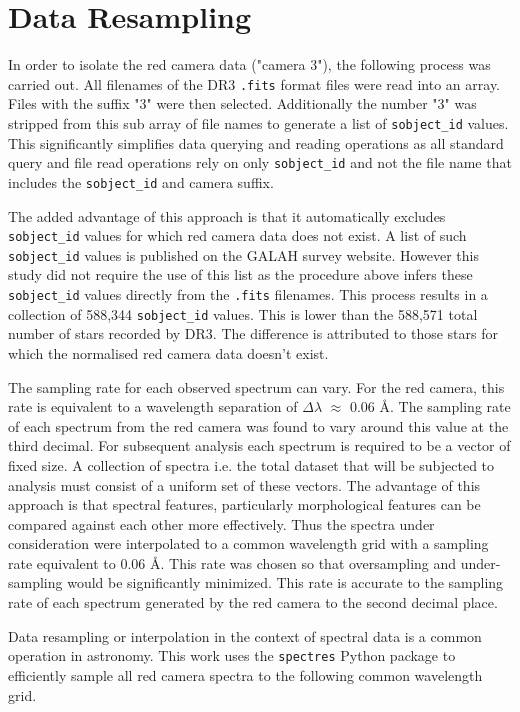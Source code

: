 \section{Data Resampling}

In order to isolate the red camera data ("camera 3"), the following process was carried out. All filenames of the DR3 \texttt{.fits} format files were read into an array. Files with the suffix "3" were then selected. Additionally the number "3" was stripped from this sub array of file names to generate a list of \texttt{sobject\_id} values. This significantly simplifies data querying and reading operations as all standard query and file read operations rely on only \texttt{sobject\_id} and not the file name that includes the \texttt{sobject\_id} and camera suffix. 

The added advantage of this approach is that it automatically excludes \texttt{sobject\_id} values for which red camera data does not exist. A list of such \texttt{sobject\_id} values is published on the GALAH survey website. However this study did not require the use of this list as the procedure above infers these \texttt{sobject\_id} values directly from the \texttt{.fits} filenames. This process results in a collection of 588,344 \texttt{sobject\_id} values. This is lower than the 588,571 total number of stars recorded by DR3. The difference is attributed to those stars for which the normalised red camera data doesn't exist. 

The sampling rate for each observed spectrum can vary. For the red camera, this rate is equivalent to a wavelength separation of $\Delta\lambda$ $\approx$ 0.06 \r{A}. The sampling rate of each spectrum from the red camera was found to vary around this value at the third decimal. For subsequent analysis each spectrum is required to be a vector of fixed size. A collection of spectra i.e. the total dataset that will be subjected to analysis must consist of a uniform set of these vectors. The advantage of this approach is that spectral features, particularly morphological features can be compared against each other more effectively. Thus the spectra under consideration were interpolated to a common wavelength grid with a sampling rate equivalent to 0.06 \r{A}. This rate was chosen so that oversampling and under-sampling would be significantly minimized. This rate is accurate to the sampling rate of each spectrum generated by the red camera to the second decimal place. 

Data resampling or interpolation in the context of spectral data is a common operation in astronomy. This work uses the \texttt{spectres} Python package \cite{carnall2017spectres} to efficiently sample all red camera spectra to the following common wavelength grid.

